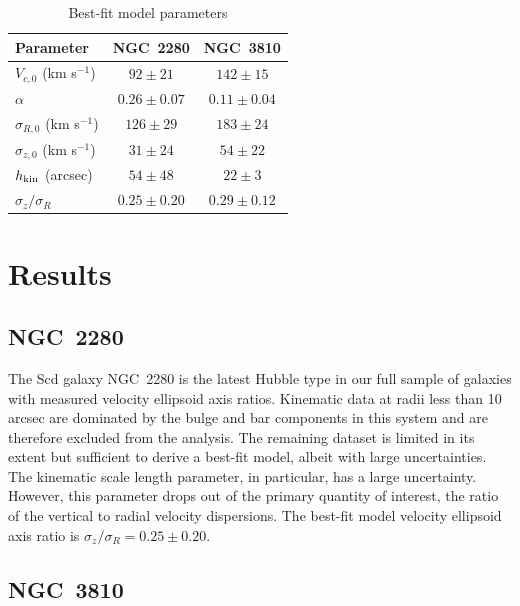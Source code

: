 \documentclass[useAMS,usenatbib]{mn2e}
\begin{document}
\begin{table}
  \centering
    \caption{Best-fit model parameters}
    \begin{tabular}{@{}lcc@{}}
    \hline
    Parameter & NGC~2280 & NGC~3810 \\
    \hline
    $V_{c,0}$ (km s$^{-1}$)        & $92 \pm 21$     & $142 \pm 15$    \\
    $\alpha$                     & $0.26 \pm 0.07$ & $0.11 \pm 0.04$ \\
    $\sigma_{R,0}$ (km s$^{-1}$)   & $126 \pm 29$    & $183 \pm 24$    \\
    $\sigma_{z,0}$ (km s$^{-1}$)   & $31 \pm 24 $    & $54 \pm 22 $    \\
    $h_{\rm kin}$ (arcsec)         & $54 \pm 48 $    & $22 \pm 3 $     \\
    $\sigma_z/\sigma_R$          & $0.25 \pm 0.20$  & $0.29 \pm 0.12$ \\
    \hline
    \end{tabular}
    \label{t:fitpar}
\end{table}



\section{Results}
\label{sec:results}

\subsection{NGC~2280}
\label{sec:n2280}

The Scd galaxy NGC~2280 is the latest Hubble type in our full sample of
galaxies with measured velocity ellipsoid axis ratios.  Kinematic data
at radii less than 10 arcsec are dominated by the bulge and bar
components in this system and are therefore excluded from the analysis.
The remaining dataset is limited in its extent but sufficient to derive
a best-fit model, albeit with large uncertainties.  The kinematic scale
length parameter, in particular, has a large uncertainty.  However, this
parameter drops out of the primary quantity of interest, the ratio of
the vertical to radial velocity dispersions.  The best-fit model
velocity ellipsoid axis ratio is $\sigma_z / \sigma_R = 0.25 \pm 0.20$.

\subsection{NGC~3810}
\end{document}
